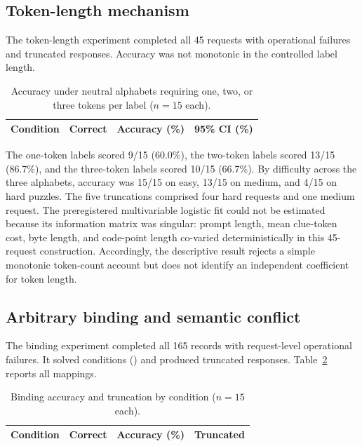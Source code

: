 \documentclass[11pt,a4paper]{article}
\begin{document}
\subsection{Token-length mechanism}
The token-length experiment completed all 45 requests with \TokenLengthOperationalFailures{} operational failures and \TokenLengthTruncations{} truncated responses. Accuracy was not monotonic in the controlled label length.

\begin{table}[H]
\centering
\caption{Accuracy under neutral alphabets requiring one, two, or three tokens per label ($n=15$ each).}
\label{tab:token-length}
\begin{tabular}{lrrr}
\toprule
Condition & Correct & Accuracy (\%) & 95\% CI (\%) \\
\midrule
%
\end{tabular}
\end{table}

The one-token labels scored 9/15 (60.0\%), the two-token labels scored 13/15 (86.7\%), and the three-token labels scored 10/15 (66.7\%). By difficulty across the three alphabets, accuracy was 15/15 on easy, 13/15 on medium, and 4/15 on hard puzzles. The five truncations comprised four hard requests and one medium request. The preregistered multivariable logistic fit could not be estimated because its information matrix was singular: prompt length, mean clue-token cost, byte length, and code-point length co-varied deterministically in this 45-request construction. Accordingly, the descriptive result rejects a simple monotonic token-count account but does not identify an independent coefficient for token length.

\subsection{Arbitrary binding and semantic conflict}
The binding experiment completed all 165 records with \BindingOperationalFailures{} request-level operational failures. It solved \BindingCorrect{} conditions (\BindingAccuracy{}) and produced \BindingTruncations{} truncated responses. Table~\ref{tab:binding} reports all mappings.

\begin{table}[H]
\centering
\small
\caption{Binding accuracy and truncation by condition ($n=15$ each).}
\label{tab:binding}
\begin{tabular}{lrrr}
\toprule
Condition & Correct & Accuracy (\%) & Truncated \\
\midrule
%
\end{tabular}
\end{table}
\end{document}
